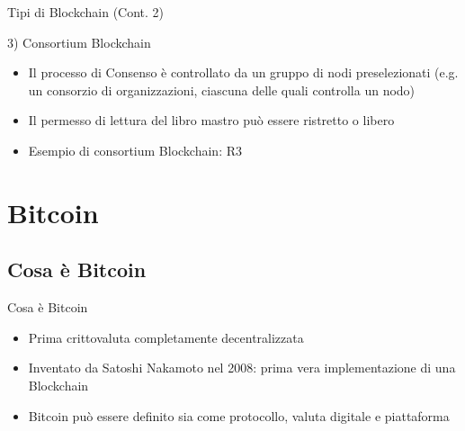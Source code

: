 \documentclass{beamer}
\begin{document}
  \begin{frame}{Tipi di Blockchain (Cont. 2)}
    \begin{block}{3) Consortium Blockchain}
      \begin{itemize}
        \item Il processo di Consenso è controllato da un gruppo di nodi preselezionati (e.g. un consorzio di organizzazioni, ciascuna delle quali controlla un nodo) 
        \item Il permesso di lettura del libro mastro può essere ristretto o libero 
        \item Esempio di consortium Blockchain: R3 \cite{R3}
      \end{itemize}
    \end{block}
  \end{frame}










  \section{Bitcoin}
  \subsection{Cosa è Bitcoin}
  \begin{frame}{Cosa è Bitcoin}
    \begin{itemize}
      \item Prima crittovaluta completamente decentralizzata
      \item Inventato da Satoshi Nakamoto nel 2008: prima vera implementazione di una Blockchain
      \item Bitcoin può essere definito sia come protocollo, valuta digitale e piattaforma
    \end{itemize}

  \end{frame}
\end{document}
